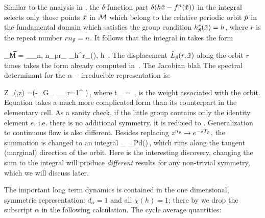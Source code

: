 Similar to the analysis in , the $\delta$-function part
$\delta (h\tilde x - f^n(\tilde x))$ in the integral selects only those points
$\tilde x$ in ${\cal M}$ which belong to the relative periodic orbit ${\tilde p}$
in the fundamental domain which satisfies the group condition
$h^{r}_{{\tilde p}}(\tilde x) = h$, where $r$ is the repeat number $r n_{\tilde p} = n$.
It follows that the integral in  takes the
form

\beq
\int_{\t {\cal M}} = \sum_{\tp}\delta_{n, n_pr}\sum_{\tx\in
\tp}\delta_{h^r_{\tp}(\tx), h}
\,.
\label{eq-trace-ir-expan}
\eeq 
The displacement $\hat{L}_{\tilde p}(r, \tilde x)$ along the orbit $r$ 
times takes the form already computed  in~. 
The Jacobian blah
The spectral determinant for the $\alpha-$irreducible representation 
is:

 \beq
 Z_{\alpha}(\beta,z)
=\exp\left(-\sum_{\sigma\in G}\sum_{\tp}
    \sum_{\tx\in\tp}\sum_{r=1}^{\infty}
    \right)\,,
\label{eq-fd-zeta}
\eeq
where
\beq
    t_{\tp} =
\,,
\eeq
is the weight associated with the orbit. Equation 
takes a much more complicated form than its counterpart in the
elementary cell. As a sanity check, if the little group contains only
the identity element $e$, i.e. there is no additional symmetry. it is
reduced to . Generalization to continuous flow is
also different. Besides replacing $z^{n_p}\to e^{-s{T_{{\tilde p}}}}$, the
summation is changed to an integral
\beq
{}\sum_{\tx\in\tp}\to 
{}\oint_{\cal P}d\tau\tx(\tau)\,,
\eeq
which runs along the tangent (marginal) direction of the orbit. Here 
is the interesting discovery, changing the sum to 
the integral will produce \emph{different} results for any 
non-trivial symmetry, which we will discuss later.

The important long term dynamics is contained in the one dimensional, 
symmetric representation: $ d_\alpha = 1 $ and all $ \chi(h) = 1 
$; there by we drop the subscript $\alpha $ in the following 
calculation. The cycle average quantities:

